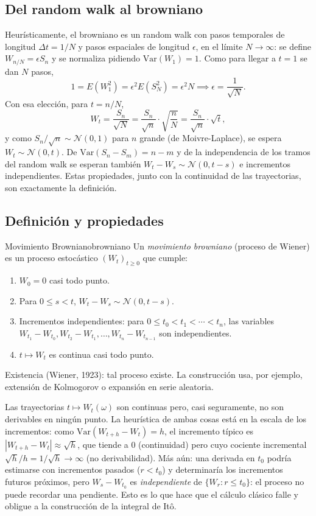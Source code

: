 \documentclass[11pt, a4paper]{article}
\begin{document}
\subsection{Del random walk al browniano}

Heurísticamente, el browniano es un random walk con pasos temporales de longitud
$\Delta t = 1/N$ y pasos espaciales de longitud $\epsilon$, en el límite $N \to \infty$: se
define $W_{n/N} = \epsilon S_n$ y se normaliza pidiendo $\mathrm{Var}(W_1) = 1$. Como para
llegar a $t = 1$ se dan $N$ pasos,
$$ 1 = E(W_1^2) = \epsilon^2 E(S_N^2) = \epsilon^2 N \implies \epsilon = \frac{1}{\sqrt{N}}. $$
Con esa elección, para $t = n/N$,
$$ W_t = \frac{S_n}{\sqrt{N}} = \frac{S_n}{\sqrt{n}} \cdot \sqrt{\frac{n}{N}} =
\frac{S_n}{\sqrt{n}} \cdot \sqrt{t}, $$
y como $S_n / \sqrt{n} \sim \mathcal{N}(0, 1)$ para $n$ grande (de Moivre-Laplace), se espera
$W_t \sim \mathcal{N}(0, t)$. De $\mathrm{Var}(S_n - S_m) = n - m$ y de la independencia de los
tramos del random walk se esperan también $W_t - W_s \sim \mathcal{N}(0, t - s)$ e incrementos
independientes. Estas propiedades, junto con la continuidad de las trayectorias, son
exactamente la definición.

\subsection{Definición y propiedades}

\begin{definicion}{Movimiento Browniano}{browniano}
Un \emph{movimiento browniano} (proceso de Wiener) es un proceso estocástico
$(W_t)_{t \ge 0}$ que cumple:
\begin{enumerate}
    \item $W_0 = 0$ casi todo punto.
    \item Para $0 \le s < t$, $W_t - W_s \sim \mathcal{N}(0, t - s)$.
    \item Incrementos independientes: para $0 \le t_0 < t_1 < \cdots < t_n$, las variables
    $W_{t_1} - W_{t_0}, W_{t_2} - W_{t_1}, \dots, W_{t_n} - W_{t_{n-1}}$ son independientes.
    \item $t \mapsto W_t$ es continua casi todo punto.
\end{enumerate}
\end{definicion}

\obs Existencia (Wiener, 1923): tal proceso existe. La construcción usa, por ejemplo,
extensión de Kolmogorov o expansión en serie aleatoria.

\obs Las trayectorias $t \mapsto W_t(\omega)$ son continuas pero, casi seguramente, no son
derivables en ningún punto. La heurística de ambas cosas está en la escala de los
incrementos: como $\mathrm{Var}(W_{t+h} - W_t) = h$, el incremento típico es
$|W_{t+h} - W_t| \approx \sqrt{h}$, que tiende a $0$ (continuidad) pero cuyo cociente
incremental $\sqrt{h}/h = 1/\sqrt{h} \to \infty$ (no derivabilidad). Más aún: una derivada en
$t_0$ podría estimarse con incrementos pasados ($r < t_0$) y determinaría los incrementos
futuros próximos, pero $W_s - W_{t_0}$ es \emph{independiente} de $\{W_r : r \le t_0\}$: el
proceso no puede recordar una pendiente. Esto es lo que hace que el cálculo clásico falle y
obligue a la construcción de la integral de Itô.
\end{document}
